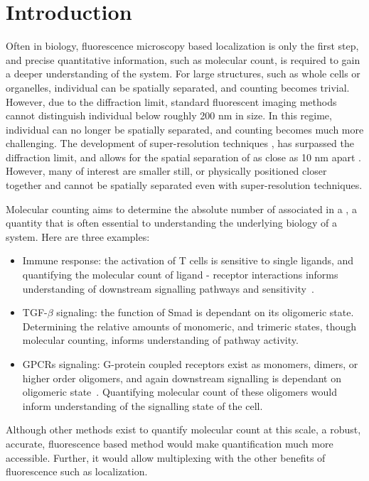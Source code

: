 \section{Introduction}

Often in biology, fluorescence microscopy based localization is only the first step, and precise quantitative information, 
  such as molecular count, is required to gain a deeper understanding of the system.
  For large structures, such as whole cells or organelles, individual \objects can be spatially separated, 
  and counting becomes trivial.
  However, due to the diffraction limit, standard fluorescent imaging methods cannot distinguish individual \objects 
  below roughly 200 nm in size. 
  In this regime, individual \objects can no longer be spatially separated, and counting becomes much more challenging. 
  The development of super-resolution techniques \cite{betzig_2006, rust_2006}, has surpassed the diffraction limit, and allows
  for the spatial separation of \objects as close as 10 nm apart \cite{valli_seeing_2021}.
  However, many \objects of interest are smaller still, or physically positioned closer 
  together and cannot be spatially separated even with super-resolution techniques.

Molecular counting aims to determine the absolute number of \smallobjects
  associated in a \object, a quantity that is often essential to understanding the
  underlying biology of a system. 
  Here are three examples:
  \begin{itemize}
  
    \item Immune response: the activation of T cells is sensitive to single ligands, and quantifying 
      the molecular count of ligand - receptor interactions informs understanding of downstream signalling pathways and sensitivity~\cite{irvine_2002}.

    \item TGF-$\beta$ signaling: the function of Smad is dependant on its oligomeric state. Determining the relative 
      amounts of monomeric, and trimeric states, though molecular counting, informs understanding of pathway activity.

    \item GPCRs signaling: G-protein coupled receptors exist as monomers, dimers, or higher order oligomers, 
      and again downstream signalling is dependant on oligomeric state~\cite{felce_2018, breitwieser_2004}.
      Quantifying molecular count of these oligomers would inform understanding of the signalling state of the cell.

    \end{itemize}
    Although other methods exist to quantify molecular count at this scale, a robust, accurate,
    fluorescence based method would make quantification much more accessible. Further, it would 
    allow multiplexing with the other benefits of fluorescence such as localization. 

